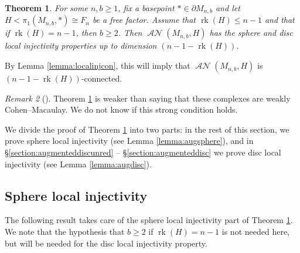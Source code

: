 \documentclass[11pt]{amsart}
\numberwithin{equation}{section}
\theoremstyle{plain}
\newtheorem{theorem}{Theorem}[section]
\theoremstyle{definition}
\theoremstyle{remark}
\newtheorem{rmk}[theorem]{Remark}
\newenvironment{remark}[1][]{\begin{rmk}[#1] \pushQED{\qed}}{\popQED \end{rmk}}
\DeclareMathOperator{\rank}{rk}
\DeclareMathOperator{\ANSpheres}{\mathcal{AN}}
\begin{document}
\begin{theorem}
\label{theorem:anspheresbetter}
For some $n,b \geq 1$, fix a basepoint $\ast \in \partial M_{n,b}$
and let $H < \pi_1(M_{n,b},\ast) \cong F_n$ be a free factor.  Assume
that $\rank(H) \leq n-1$ and that if $\rank(H) = n-1$, then $b \geq 2$.
Then $\ANSpheres(M_{n,b},H)$ has
the sphere and disc local injectivity properties up to dimension $(n-1-\rank(H))$.
\end{theorem}

By Lemma \ref{lemma:localinjcon}, this will imply that $\ANSpheres(M_{n,b},H)$ is $(n-1-\rank(H))$-connected.

\begin{remark}
Theorem \ref{theorem:anspheresbetter} is weaker than saying that these complexes
are weakly Cohen--Macaulay.  We do not know if this strong condition holds.
\end{remark}

We divide the proof of Theorem \ref{theorem:anspheresbetter} into two parts: in the rest
of this section, we prove sphere local injectivity (see Lemma \ref{lemma:augsphere}), and
in \S \ref{section:augmenteddiscunred} -- \S \ref{section:augmenteddisc} we prove disc local injectivity
(see Lemma \ref{lemma:augdisc}).

\subsection{Sphere local injectivity}
The following result takes care of the sphere local injectivity part of
Theorem \ref{theorem:anspheresbetter}.  We note that the hypothesis
that $b \geq 2$ if $\rank(H) = n-1$ is not needed here, but will be
needed for the disc local injectivity property.
\end{document}
